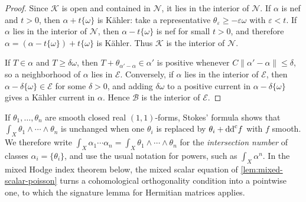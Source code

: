 \begin{proof}
Since $\mathcal K$ is open and contained in $\mathcal N$, it lies in the interior of $\mathcal N$. If $\alpha$ is nef and $t>0$, then $\alpha+t\{\omega\}$ is K\"ahler: take a representative $\theta_\varepsilon\geq-\varepsilon\omega$ with $\varepsilon<t$. If $\alpha$ lies in the interior of $\mathcal N$, then $\alpha-t\{\omega\}$ is nef for small $t>0$, and therefore $\alpha=(\alpha-t\{\omega\})+t\{\omega\}$ is K\"ahler. Thus $\mathcal K$ is the interior of $\mathcal N$.

If $T\in\alpha$ and $T\geq\delta\omega$, then $T+\theta_{\alpha'-\alpha}\in\alpha'$ is positive whenever $C\|\alpha'-\alpha\|\leq\delta$, so a neighborhood of $\alpha$ lies in $\mathcal E$. Conversely, if $\alpha$ lies in the interior of $\mathcal E$, then $\alpha-\delta\{\omega\}\in\mathcal E$ for some $\delta>0$, and adding $\delta\omega$ to a positive current in $\alpha-\delta\{\omega\}$ gives a K\"ahler current in $\alpha$. Hence $\mathcal B$ is the interior of $\mathcal E$.
\end{proof}

If $\theta_1,\ldots,\theta_n$ are smooth closed real $(1,1)$-forms, Stokes' formula shows that $\int_X\theta_1\wedge\cdots\wedge\theta_n$ is unchanged when one $\theta_i$ is replaced by $\theta_i+\mathrm{dd}^{\mathrm{c}} f$ with $f$ smooth. We therefore write $\int_X\alpha_1\cdots\alpha_n=\int_X\theta_1\wedge\cdots\wedge\theta_n$ for the \emph{intersection number} of classes $\alpha_i=\{\theta_i\}$, and use the usual notation for powers, such as $\int_X\alpha^n$. In the mixed Hodge index theorem below, the mixed scalar equation of \cref{lem:mixed-scalar-poisson} turns a cohomological orthogonality condition into a pointwise one, to which the signature lemma for Hermitian matrices applies.

